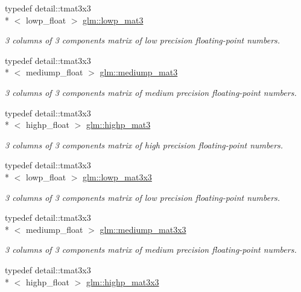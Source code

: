 \begin{DoxyCompactItemize}
typedef detail\-::tmat3x3\\*
$<$ lowp\-\_\-float $>$ \hyperlink{group__core__precision_gaf32a06a88eff09262459a4448abea9ad}{glm\-::lowp\-\_\-mat3}
\begin{DoxyCompactList}\small\item\em 3 columns of 3 components matrix of low precision floating-\/point numbers. \end{DoxyCompactList}\item 
typedef detail\-::tmat3x3\\*
$<$ mediump\-\_\-float $>$ \hyperlink{group__core__precision_gab9f55249d1c065a72d525f3ffd3524be}{glm\-::mediump\-\_\-mat3}
\begin{DoxyCompactList}\small\item\em 3 columns of 3 components matrix of medium precision floating-\/point numbers. \end{DoxyCompactList}\item 
typedef detail\-::tmat3x3\\*
$<$ highp\-\_\-float $>$ \hyperlink{group__core__precision_ga28f20673ba4b1515f27a42a60900a75d}{glm\-::highp\-\_\-mat3}
\begin{DoxyCompactList}\small\item\em 3 columns of 3 components matrix of high precision floating-\/point numbers. \end{DoxyCompactList}\item 
typedef detail\-::tmat3x3\\*
$<$ lowp\-\_\-float $>$ \hyperlink{group__core__precision_gaf4dbe8a227cee5c02b5ab3faa0d948f5}{glm\-::lowp\-\_\-mat3x3}
\begin{DoxyCompactList}\small\item\em 3 columns of 3 components matrix of low precision floating-\/point numbers. \end{DoxyCompactList}\item 
typedef detail\-::tmat3x3\\*
$<$ mediump\-\_\-float $>$ \hyperlink{group__core__precision_ga21bb45bd57a97bf7b0b41e86328d72b2}{glm\-::mediump\-\_\-mat3x3}
\begin{DoxyCompactList}\small\item\em 3 columns of 3 components matrix of medium precision floating-\/point numbers. \end{DoxyCompactList}\item 
typedef detail\-::tmat3x3\\*
$<$ highp\-\_\-float $>$ \hyperlink{group__core__precision_ga072d1e03e15a20a108632540802c9a7d}{glm\-::highp\-\_\-mat3x3}

\end{DoxyCompactItemize}
